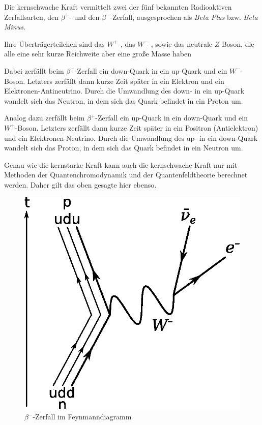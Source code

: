 Die kernschwache Kraft vermittelt zwei der fünf bekannten Radioaktiven Zerfallsarten, den $\beta^+$- und den $\beta^-$-Zerfall, ausgesprochen als \textit{Beta Plus} bzw. \textit{Beta Minus}.

Ihre Überträgerteilchen sind das $W^+$-, das $W^-$-, sowie das neutrale $Z$-Boson, die alle eine sehr kurze Reichweite aber eine große Masse haben

Dabei zerfällt beim $\beta^-$-Zerfall ein down-Quark in ein up-Quark und ein $W^-$-Boson. Letzters zerfällt dann kurze Zeit später in ein Elektron und ein Elektronen-Antineutrino. Durch die Umwandlung des down- in ein up-Quark wandelt sich das Neutron, in dem sich das Quark befindet in ein Proton um.

Analog dazu zerfällt beim $\beta^+$-Zerfall ein up-Quark in ein down-Quark und ein $W^+$-Boson. Letzters zerfällt dann kurze Zeit später in ein Positron (Antielektron) und ein Elektronen-Neutrino. Durch die Umwandlung des up- in ein down-Quark wandelt sich das Proton, in dem sich das Quark befindet in ein Neutron um.

Genau wie die kernstarke Kraft kann auch die kernschwache Kraft nur mit Methoden der Quantenchromodynamik und der Quantenfeldtheorie berechnet werden. Daher gilt das oben gesagte hier ebenso.

\begin{figure}
    \centering
    \def\svgwidth{\columnwidth}
    \includegraphics[scale=0.5]{Beta_Negative_Decay.eps}
    \caption{$\beta^-$-Zerfall im Feynmanndiagramm} 
\end{figure}

